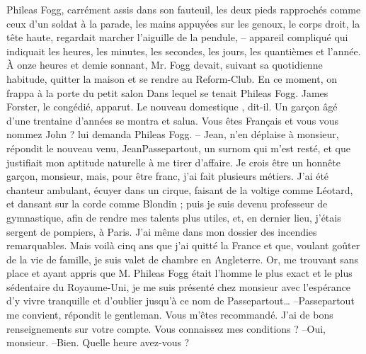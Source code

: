 \documentclass[12pt,a4paper,openany]{book}
\begin{document}
                Phileas Fogg, carrément assis dans son fauteuil, les deux pieds rapprochés comme ceux d’un soldat à la parade, les mains appuyées sur les genoux, le corps droit, la tête haute, regardait marcher l’aiguille de la pendule, – appareil compliqué qui indiquait les heures, les minutes, les secondes, les jours, les quantièmes et l’année. À onze heures et demie sonnant, Mr. Fogg devait, suivant sa quotidienne habitude, quitter la maison et se rendre au Reform-Club.
                En ce moment, on frappa à la porte du petit salon Dans lequel se tenait Phileas Fogg.
                James Forster, le congédié, apparut.
                \og Le nouveau domestique \fg, dit-il.
                Un garçon âgé d’une trentaine d’années se montra et salua.
                \og Vous êtes Français et vous vous nommez John ? lui demanda Phileas Fogg.
                – Jean, n’en déplaise à monsieur, répondit le nouveau venu, JeanPassepartout, un surnom qui m’est resté, et que justifiait mon aptitude naturelle à me tirer d’affaire. Je crois être un honnête garçon, monsieur, mais, pour être franc, j’ai fait plusieurs métiers. J’ai été chanteur ambulant, écuyer dans un cirque, faisant de la voltige comme Léotard, et dansant sur la corde comme Blondin ; puis je suis devenu professeur de gymnastique, afin de rendre mes talents plus utiles, et, en dernier lieu, j’étais sergent de pompiers, à Paris. J’ai même dans mon dossier des incendies remarquables. Mais voilà cinq ans que j’ai quitté la France et que, voulant goûter de la vie de famille, je suis valet de chambre en Angleterre. Or, me trouvant sans place et ayant appris que M. Phileas Fogg était l’homme le plus exact et le plus sédentaire du Royaume-Uni, je me suis présenté chez monsieur avec l’espérance d’y vivre tranquille et d’oublier jusqu’à ce nom de Passepartout…
                –Passepartout me convient, répondit le gentleman. Vous m’êtes recommandé. J’ai de bons renseignements sur votre compte. Vous connaissez mes conditions ?
                –Oui, monsieur.
                –Bien. Quelle heure avez-vous ?
\end{document}

